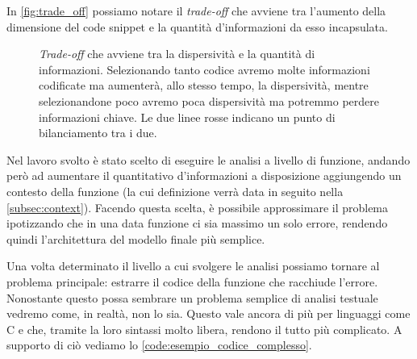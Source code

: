 In \autoref{fig:trade_off} possiamo notare il \textit{trade-off} che avviene tra l'aumento della dimensione del code snippet e la quantità d'informazioni da esso incapsulata. 

\begin{figure}[h]
  \centering
  \caption{\textit{Trade-off} che avviene tra la dispersività e la quantità di informazioni. Selezionando tanto codice avremo molte informazioni codificate ma aumenterà, allo stesso tempo, la dispersività, mentre selezionandone poco avremo poca dispersività ma potremmo perdere informazioni chiave.
    Le due linee rosse indicano un punto di bilanciamento tra i due.
  }
  \label{fig:trade_off}
\end{figure}

Nel lavoro svolto è stato scelto di eseguire le analisi a livello di funzione, andando però ad aumentare il quantitativo d'informazioni a disposizione aggiungendo un contesto della funzione (la cui definizione verrà data in seguito nella \autoref{subsec:context}). 
Facendo questa scelta, è possibile approssimare il problema ipotizzando che in una data funzione ci sia massimo un solo errore, rendendo quindi l'architettura del modello finale più semplice.

Una volta determinato il livello a cui svolgere le analisi possiamo tornare al problema principale: estrarre il codice della funzione che racchiude l'errore. 
Nonostante questo possa sembrare un problema semplice di analisi testuale vedremo come, in realtà, non lo sia.
Questo vale ancora di più per linguaggi come C e \CPP{} che, tramite la loro sintassi molto libera, rendono il tutto più complicato.
A supporto di ciò vediamo lo \autoref{code:esempio_codice_complesso}.

